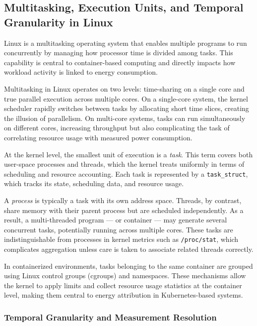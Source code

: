 \subsection{Multitasking, Execution Units, and Temporal Granularity in Linux}

Linux is a multitasking operating system that enables multiple programs to run concurrently by managing how processor time is divided among tasks. This capability is central to container-based computing and directly impacts how workload activity is linked to energy consumption.

Multitasking in Linux operates on two levels: time-sharing on a single core and true parallel execution across multiple cores. On a single-core system, the kernel scheduler rapidly switches between tasks by allocating short time slices, creating the illusion of parallelism. On multi-core systems, tasks can run simultaneously on different cores, increasing throughput but also complicating the task of correlating resource usage with measured power consumption.

At the kernel level, the smallest unit of execution is a \emph{task}. This term covers both user-space processes and threads, which the kernel treats uniformly in terms of scheduling and resource accounting. Each task is represented by a \texttt{task\_struct}, which tracks its state, scheduling data, and resource usage.

A \emph{process} is typically a task with its own address space. Threads, by contrast, share memory with their parent process but are scheduled independently. As a result, a multi-threaded program — or container — may generate several concurrent tasks, potentially running across multiple cores. These tasks are indistinguishable from processes in kernel metrics such as \texttt{/proc/stat}, which complicates aggregation unless care is taken to associate related threads correctly.

In containerized environments, tasks belonging to the same container are grouped using Linux control groups (cgroups) and namespaces. These mechanisms allow the kernel to apply limits and collect resource usage statistics at the container level, making them central to energy attribution in Kubernetes-based systems.

\subsubsection*{Temporal Granularity and Measurement Resolution}

